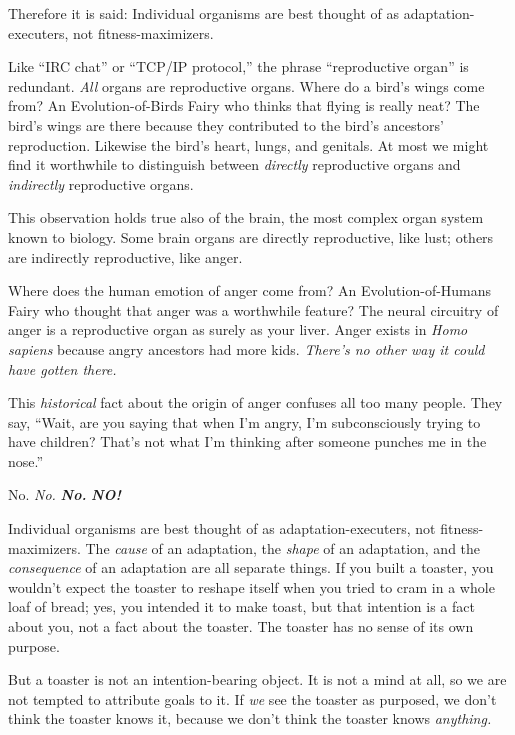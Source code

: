 {{
 Therefore it is said: Individual organisms are best thought of as
adaptation-executers, not fitness-maximizers.}

\myendsectiontext


\bigskip


{
 Like ``IRC chat'' or
``TCP/IP protocol,'' the phrase
``reproductive organ'' is redundant.
\textit{All} organs are reproductive organs. Where do a
bird's wings come from? An Evolution-of-Birds Fairy who
thinks that flying is really neat? The bird's wings are
there because they contributed to the bird's
ancestors' reproduction. Likewise the
bird's heart, lungs, and genitals. At most we might
find it worthwhile to distinguish between \textit{directly}
reproductive organs and \textit{indirectly} reproductive organs. }

{
 This observation holds true also of the brain, the most complex
organ system known to biology. Some brain organs are directly
reproductive, like lust; others are indirectly reproductive, like
anger.}

{
 Where does the human emotion of anger come from? An
Evolution-of-Humans Fairy who thought that anger was a worthwhile
feature? The neural circuitry of anger is a reproductive organ as
surely as your liver. Anger exists in \textit{Homo sapiens} because
angry ancestors had more kids. \textit{There's no other
way it could have gotten there.}}

{
 This \textit{historical} fact about the origin of anger confuses
all too many people. They say, ``Wait, are you saying
that when I'm angry, I'm subconsciously
trying to have children? That's not what
I'm thinking after someone punches me in the
nose.''}

{
 No. \textit{No.} \textbf{\textit{No.}} \textbf{\textit{NO!}}}

{
 Individual organisms are best thought of as adaptation-executers,
not fitness-maximizers. The \textit{cause} of an adaptation, the
\textit{shape} of an adaptation, and the \textit{consequence} of an
adaptation are all separate things. If you built a toaster, you
wouldn't expect the toaster to reshape itself when you
tried to cram in a whole loaf of bread; yes, you intended it to make
toast, but that intention is a fact about you, not a fact about the
toaster. The toaster has no sense of its own purpose.}

{
 But a toaster is not an intention-bearing object. It is not a mind
at all, so we are not tempted to attribute goals to it. If \textit{we}
see the toaster as purposed, we don't think the toaster
knows it, because we don't think the toaster knows
\textit{anything.}}

}
